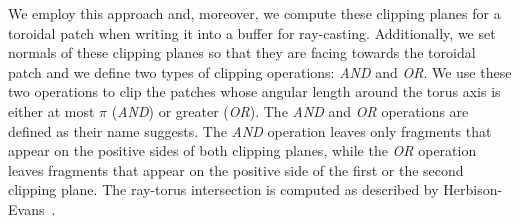 We employ this approach and, moreover, we compute these clipping planes for a toroidal patch when writing it into a buffer for ray-casting.
Additionally, we set normals of these clipping planes so that they are facing towards the toroidal patch and we define two types of clipping operations: \textit{AND} and \textit{OR}.
We use these two operations to clip the patches whose angular length around the torus axis is either at most $\pi$ (\textit{AND}) or greater (\textit{OR}).
The \textit{AND} and \textit{OR} operations are defined as their name suggests.
The \textit{AND} operation leaves only fragments that appear on the positive sides of both clipping planes, while the \textit{OR} operation leaves fragments that appear on the positive side of the first or the second clipping plane.
The ray-torus intersection is computed as described by Herbison-Evans~\cite{herbisonevans1995solving}.




